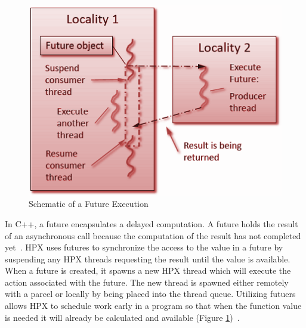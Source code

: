 \begin{figure}[ht]
\centering
\includegraphics[scale=0.8]{images/future_schematics.png}
\caption[Schematic of a Future Execution]{Schematic of a Future Execution}
\label{fig:future_schematics}
\end{figure}

In C++, a future encapsulates a delayed computation. A future holds the result of an asynchronous call because the computation of the result has not completed yet~\cite{stroustrup2013c++}. HPX uses futures to synchronize the access to the value in a future by suspending any HPX threads requesting the result until the value is available. When a future is created, it spawns a new HPX thread which will execute the action associated with the future. The new thread is spawned either remotely with a parcel or locally by being placed into the thread queue.  Utilizing futuers allows HPX to schedule work early in a program so that when the function value is needed it will already be calculated and available (Figure \ref{fig:future_schematics})~\cite{kaiser2009parallex}.
